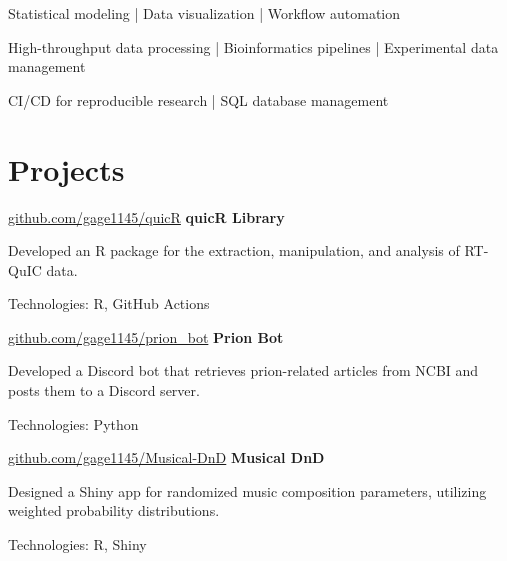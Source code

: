 \documentclass{resume}
\begin{document}
        \begin{onecolentry}
            \begin{highlights}
                \item Statistical modeling | Data visualization | Workflow automation  
                \item High-throughput data processing | Bioinformatics pipelines | Experimental data management  
                \item CI/CD for reproducible research | SQL database management 
            \end{highlights}
        \end{onecolentry}
    
    
    \section{Projects}

        \begin{software}{\href{https://github.com/gage1145/quicR}{github.com/gage1145/quicR}}
            \textbf{quicR Library}
        \end{software}
        \begin{highlights}
            \item Developed an R package for the extraction, manipulation, and analysis of RT-QuIC data.
            \item Technologies: R, GitHub Actions
        \end{highlights}

        \begin{software}{\href{https://github.com/gage1145/prion_bot}{github.com/gage1145/prion\_bot}}
            \textbf{Prion Bot}
        \end{software}
        \begin{highlights}
            \item Developed a Discord bot that retrieves prion-related articles from NCBI and posts them to a Discord server.
            \item Technologies: Python
        \end{highlights}

        \begin{software}{\href{https://github.com/gage1145/Musical-DnD}{github.com/gage1145/Musical-DnD}}
            \textbf{Musical DnD}
        \end{software}
        \begin{highlights}
            \item Designed a Shiny app for randomized music composition parameters, utilizing weighted probability distributions.
            \item Technologies: R, Shiny
        \end{highlights}



\end{document}
